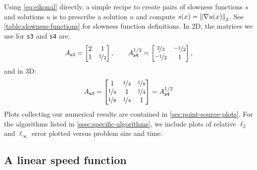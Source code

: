 \documentclass[sisc-eikonal.tex]{subfiles}
\begin{document}
Using \cref{eq:eikonal} directly, a simple recipe to create pairs of
slowness functions $s$ and solutions $u$ is to prescribe a solution
$u$ and compute $s(x) = \left\|\nabla u(x)\right\|_2$. See
\cref{table:slowness-functions} for slowness function definitions. In
2D, the matrices we use for \texttt{s3} and \texttt{s4} are:
\begin{equation}
  A_{\texttt{s3}} = \begin{bmatrix}
    2 & 1 \\
    1 & \nicefrac{1}{2}
  \end{bmatrix}, \qquad A^{1/2}_{\texttt{s4}} = \begin{bmatrix}
    \nicefrac{2}{3} & \nicefrac{-1}{2} \\
    \nicefrac{-1}{2} & 1
  \end{bmatrix},
\end{equation}
and in 3D:
\begin{equation}
  A_{\texttt{s3}} = \begin{bmatrix}
    1 & \nicefrac{1}{4} & \nicefrac{1}{8} \\
    \nicefrac{1}{4} & 1 & \nicefrac{1}{4} \\
    \nicefrac{1}{8} & \nicefrac{1}{4} & 1
  \end{bmatrix} = A_{\texttt{s4}}^{1/2}
\end{equation}
Plots collecting our numerical results are contained in
\cref{sec:point-source-plots}. For the algorithms listed in
\cref{ssec:specific-algorithms}, we include plots of relative $\ell_2$
and $\ell_\infty$ error plotted versus problem size and time.

\subsection{A linear speed function}\label{ssec:slotnick}
\end{document}
